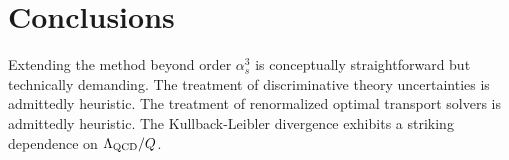 \section{Conclusions}\label{sec:conclusions}

Extending the method beyond order $\alpha_s^3$ is conceptually
straightforward but technically demanding. The treatment of
discriminative theory uncertainties is admittedly heuristic. The
treatment of renormalized optimal transport solvers is admittedly
heuristic. The Kullback-Leibler divergence exhibits a striking
dependence on $\Lambda_{\rm QCD}/Q$.

